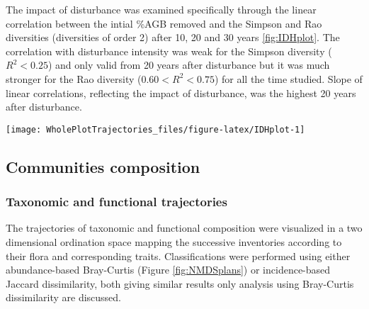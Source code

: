 \documentclass[fleqn,10pt]{ArtEcoFoG} %
\theoremstyle{definition}
\theoremstyle{definition}
\theoremstyle{definition}
\theoremstyle{remark}
\begin{document}
The impact of disturbance was examined specifically through the linear
correlation between the intial \%AGB removed and the Simpson and Rao
diversities (diversities of order 2) after 10, 20 and 30 years
\ref{fig:IDHplot}. The correlation with disturbance intensity was weak
for the Simpson diversity (\(R^2<0.25\)) and only valid from 20 years
after disturbance but it was much stronger for the Rao diversity
(\(0.60<R^2<0.75\)) for all the time studied. Slope of linear
correlations, reflecting the impact of disturbance, was the highest 20
years after disturbance.

\begin{figure*}

{\centering \texttt{[image: WholePlotTrajectories\_files/figure-latex/IDHplot-1]} 

}

\caption{Upper panels, Trajectories of the Simpson taxonomic diversity \textbf{(a)} and Rao functional diversity \textbf{(b)} over 30 years after disturbance, corresponding to the median and 0.025 and 0.975 percentile observed after 50 iteration of the taxonomic uncertainty propagation and the missing trait value filling processes. Initial treatments are represented by solid lines colors with green for control, blue for T1,orange for T2 and red for T3. Lower panels, Relationship between the initial \%AGB removed and the median values of Simpson \textbf{(c)} and Rao \textbf{(d)} diversities at three times after disturbance. Solid lines colors represent the time, 10 years (yellow), 20 years (orange) and 30 years (brown) after disturbance.}\label{fig:IDHplot}
\end{figure*}

\subsection{Communities composition}\label{communities-composition}

\subsubsection{Taxonomic and functional
trajectories}\label{taxonomic-and-functional-trajectories}

The trajectories of taxonomic and functional composition were visualized
in a two dimensional ordination space mapping the successive inventories
according to their flora and corresponding traits. Classifications were
performed using either abundance-based Bray-Curtis (Figure
\ref{fig:NMDSplans}) or incidence-based Jaccard dissimilarity, both
giving similar results only analysis using Bray-Curtis dissimilarity are
discussed.
\end{document}
